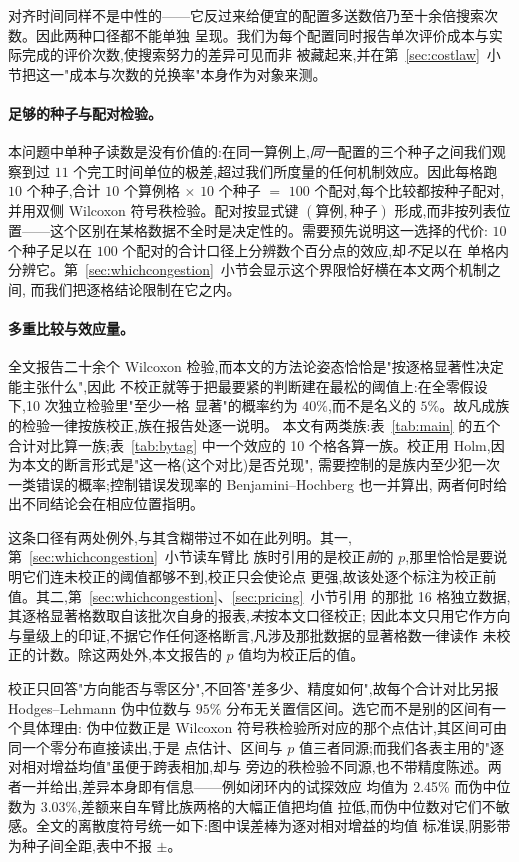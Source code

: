 \documentclass[manuscript,screen,review]{acmart}
\newcommand{\NCases}{10}
\newcommand{\NSeeds}{10}
\newcommand{\NPairs}{100}
\newcommand{\GainProbeLoop}{2.45\%}      %
\newcommand{\HLProbeLoop}{3.03\%}
\newcommand{\MatrixCells}{16}
\begin{document}
对齐时间同样不是中性的——它反过来给便宜的配置多送数倍乃至十余倍搜索次数。因此两种口径都不能单独
呈现。我们为每个配置同时报告单次评价成本与实际完成的评价次数,使搜索努力的差异可见而非
被藏起来,并在第~\ref{sec:costlaw}~小节把这一"成本与次数的兑换率"本身作为对象来测。

\paragraph{足够的种子与配对检验。}
本问题中单种子读数是没有价值的:在同一算例上,\emph{同一}配置的三个种子之间我们观察到过
$11$ 个完工时间单位的极差,超过我们所度量的任何机制效应。因此每格跑 $\NSeeds$ 个种子,合计
$\NCases$ 个算例格 $\times$ $\NSeeds$ 个种子 $=$ $\NPairs$ 个配对,每个比较都按种子配对,
并用双侧 Wilcoxon 符号秩检验。配对按显式键 $(\text{算例},\text{种子})$
形成,而非按列表位置——这个区别在某格数据不全时是决定性的。需要预先说明这一选择的代价:
$\NSeeds$ 个种子足以在 $\NPairs$ 个配对的合计口径上分辨数个百分点的效应,却\emph{不}足以在
单格内分辨它。第~\ref{sec:whichcongestion}~小节会显示这个界限恰好横在本文两个机制之间,
而我们把逐格结论限制在它之内。

\paragraph{多重比较与效应量。}
全文报告二十余个 Wilcoxon 检验,而本文的方法论姿态恰恰是"按逐格显著性决定能主张什么",因此
不校正就等于把最要紧的判断建在最松的阈值上:在全零假设下,\NCases{} 次独立检验里"至少一格
显著"的概率约为 $40\%$,而不是名义的 $5\%$。故凡成族的检验一律按族校正,族在报告处逐一说明。
本文有两类族:表~\ref{tab:main} 的五个合计对比算一族;表~\ref{tab:bytag} 中一个效应的
\NCases{} 个格各算一族。校正用 Holm,因为本文的断言形式是"这一格(这个对比)是否兑现",
需要控制的是族内至少犯一次一类错误的概率;控制错误发现率的 Benjamini--Hochberg 也一并算出,
两者何时给出不同结论会在相应位置指明。

这条口径有两处例外,与其含糊带过不如在此列明。其一,第~\ref{sec:whichcongestion}~小节读车臂比
族时引用的是校正\emph{前}的 $p$,那里恰恰是要说明它们连未校正的阈值都够不到,校正只会使论点
更强,故该处逐个标注为校正前值。其二,第~\ref{sec:whichcongestion}、\ref{sec:pricing}~小节引用
的那批 \MatrixCells{} 格独立数据,其逐格显著格数取自该批次自身的报表,\emph{未}按本文口径校正;
因此本文只用它作方向与量级上的印证,不据它作任何逐格断言,凡涉及那批数据的显著格数一律读作
未校正的计数。除这两处外,本文报告的 $p$ 值均为校正后的值。

校正只回答"方向能否与零区分",不回答"差多少、精度如何",故每个合计对比另报
Hodges--Lehmann 伪中位数与 $95\%$ 分布无关置信区间。选它而不是别的区间有一个具体理由:
伪中位数正是 Wilcoxon 符号秩检验所对应的那个点估计,其区间可由同一个零分布直接读出,于是
点估计、区间与 $p$ 值三者同源;而我们各表主用的"逐对相对增益均值"虽便于跨表相加,却与
旁边的秩检验不同源,也不带精度陈述。两者一并给出,差异本身即有信息——例如闭环内的试探效应
均值为 \GainProbeLoop{} 而伪中位数为 \HLProbeLoop{},差额来自车臂比族两格的大幅正值把均值
拉低,而伪中位数对它们不敏感。全文的离散度符号统一如下:图中误差棒为逐对相对增益的均值
标准误,阴影带为种子间全距,表中不报 $\pm$。
\end{document}

